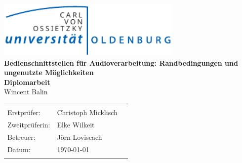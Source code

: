\begin{titlepage}
	\begin{center}
	\includegraphics[width=9cm]{img/Uni-Logo.pdf}\\[3.2cm]
	{
		\sffamily\bfseries
		\Large{Bedienschnittstellen für Audioverarbeitung: Randbedingungen und ungenutzte Möglichkeiten}\\[5ex]
			
		\large{Diplomarbeit}\\[5ex]
	}			
	\Large{Wincent Balin}
	\end{center}
	
	\vfill
	
	\begin{center}
		\begin{tabular}{lll}
			\hline \\[3mm]
			Erstprüfer:    & Christoph Micklisch & \\[2mm]
			Zweitprüferin: & Elke Wilkeit & \\[2mm]
			Betreuer:      & Jörn Loviscach & \\[2mm]
			Datum:	       & \today & \\[6mm]
			\hline \\
		\end{tabular}
	\end{center}
	
\end{titlepage}